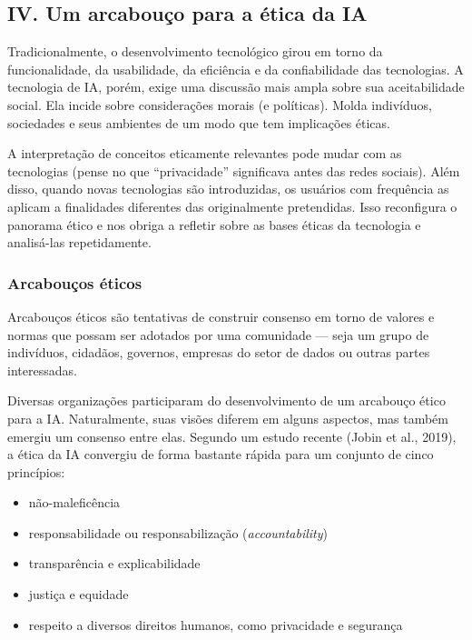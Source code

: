 \documentclass[
  11pt,
]{article}
\providecommand{\tightlist}{%
  \setlength{\itemsep}{0pt}\setlength{\parskip}{0pt}}
\begin{document}
\subsection{IV. Um arcabouço para a ética da
IA}\label{iv.-um-arcabouuxe7o-para-a-uxe9tica-da-ia}

Tradicionalmente, o desenvolvimento tecnológico girou em torno da
funcionalidade, da usabilidade, da eficiência e da confiabilidade das
tecnologias. A tecnologia de IA, porém, exige uma discussão mais ampla
sobre sua aceitabilidade social. Ela incide sobre considerações morais
(e políticas). Molda indivíduos, sociedades e seus ambientes de um modo
que tem implicações éticas.

A interpretação de conceitos eticamente relevantes pode mudar com as
tecnologias (pense no que ``privacidade'' significava antes das redes
sociais). Além disso, quando novas tecnologias são introduzidas, os
usuários com frequência as aplicam a finalidades diferentes das
originalmente pretendidas. Isso reconfigura o panorama ético e nos
obriga a refletir sobre as bases éticas da tecnologia e analisá-las
repetidamente.

\subsubsection{Arcabouços éticos}\label{arcabouuxe7os-uxe9ticos}

Arcabouços éticos são tentativas de construir consenso em torno de
valores e normas que possam ser adotados por uma comunidade --- seja um
grupo de indivíduos, cidadãos, governos, empresas do setor de dados ou
outras partes interessadas.

Diversas organizações participaram do desenvolvimento de um arcabouço
ético para a IA. Naturalmente, suas visões diferem em alguns aspectos,
mas também emergiu um consenso entre elas. Segundo um estudo recente
(Jobin et al., 2019), a ética da IA convergiu de forma bastante rápida
para um conjunto de cinco princípios:

\begin{itemize}
\tightlist
\item
  não-maleficência
\item
  responsabilidade ou responsabilização (\emph{accountability})
\item
  transparência e explicabilidade
\item
  justiça e equidade
\item
  respeito a diversos direitos humanos, como privacidade e segurança
\end{itemize}
\end{document}
